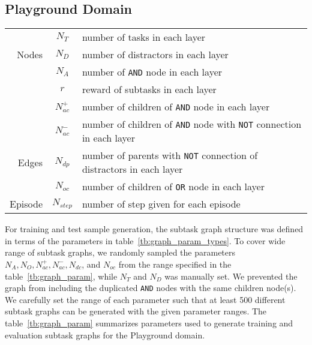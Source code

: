 \documentclass{article} \usepackage{iclr2020_conference,times}
\begin{document}
\subsection{Playground Domain}
\begin{table*}[!hbt] 
\centering
\begin{tabular}{r|c|l}
  \hline
      & $N_T$       & number of tasks in each layer \\ 
Nodes & $N_D$       & number of distractors in each layer \\
      & $N_A$       & number of \texttt{AND} node in each layer \\
      & $r$       & reward of subtasks in each layer \\
  \hline
      & $N_{ac}^{+}$& number of children of \texttt{AND} node in each layer \\ 
      & $N_{ac}^{-}$& number of children of \texttt{AND} node with \texttt{NOT} connection in each layer \\
Edges & $N_{dp}$      & number of parents with \texttt{NOT} connection of distractors in each layer \\
      & $N_{oc}$      & number of children of \texttt{OR} node in each layer \\
  \hline
Episode & $N_{step}$    & number of step given for each episode \\
    \hline
\end{tabular}
\vspace{-2pt}
\caption{Parameters for generating task including subtask graph parameter and episode length.}
\label{tb:graph_param_types}
\end{table*}
For training and test sample generation, the subtask graph structure was defined in terms of the parameters in table~\ref{tb:graph_param_types}. To cover wide range of subtask graphs, we randomly sampled the parameters $N_A, N_O, N_{ac}^{+}, N_{ac}^{-}, N_{dc}$, and $N_{oc}$ from the range specified in the table~\ref{tb:graph_param}, while $N_T$ and $N_D$ was manually set. We prevented the graph from including the duplicated \texttt{AND} nodes with the same children node(s). We carefully set the range of each parameter such that at least 500 different subtask graphs can be generated with the given parameter ranges. The table~\ref{tb:graph_param} summarizes parameters used to generate training and evaluation subtask graphs for the Playground domain.
\end{document}
